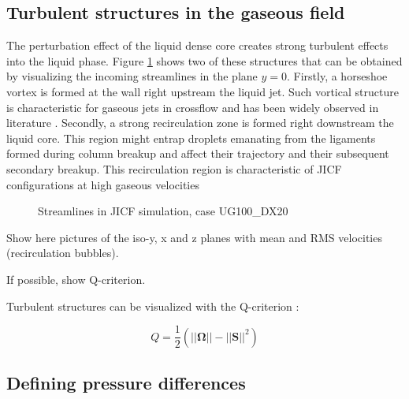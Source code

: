 \subsection{Turbulent structures in the gaseous field}
\label{ch5:subsec_turbulent_structures_in_gaseous_field}

The perturbation effect of the liquid dense core creates strong turbulent effects into the liquid phase. Figure \ref{fig:streamlines_UG100_DX20_from_dump} shows two of these structures that can be obtained by visualizing the incoming streamlines in the plane $y = 0$. Firstly, a horseshoe vortex is formed at the wall right upstream the liquid jet. Such vortical structure is characteristic for gaseous jets in crossflow and has been widely observed in literature . Secondly, a strong recirculation zone is formed right downstream the liquid core. This region might entrap droplets emanating from the ligaments formed during column breakup and affect their trajectory and their subsequent secondary breakup. This recirculation region is characteristic of JICF configurations at high gaseous velocities 

\begin{figure}[h!]
	\centering
	\vspace*{-0.5in}
	\caption{Streamlines in JICF simulation, case UG100\_DX20}
	\label{fig:streamlines_UG100_DX20_from_dump}
\end{figure}


Show here pictures of the iso-y, x and z planes with mean and RMS velocities (recirculation bubbles).

If possible, show Q-criterion.

Turbulent structures can be visualized with the Q-criterion :

\begin{equation}
Q = \frac{1}{2} \left( ||\pmb{\Omega}|| - ||\textbf{S}||^2 \right)
\end{equation}


\subsection{Defining pressure differences}
\label{ch5:subsec_defining_pressure_differences}

